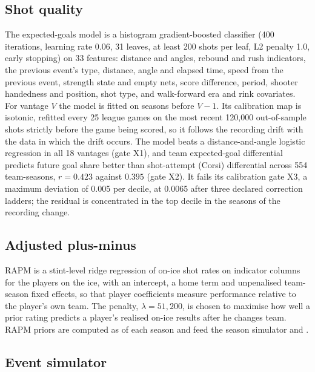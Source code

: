 \subsection{Shot quality}
\label{sec:m-xg}

The expected-goals model is a histogram gradient-boosted classifier
\citep{friedman2001greedy,ke2017lightgbm} (400
iterations, learning rate 0.06, 31 leaves, at least 200 shots per leaf, L2
penalty 1.0, early stopping) on 33 features: distance and angles, rebound and
rush indicators, the previous event's type, distance, angle and elapsed time,
speed from the previous event, strength state and empty nets, score
difference, period, shooter handedness and position, shot type, and
walk-forward era and rink covariates. For vantage $V$ the model is fitted on
seasons before $V-1$. Its calibration map is isotonic, refitted every 25 league
games on the most recent 120,000 out-of-sample shots strictly before the game
being scored, so it follows the recording drift with the data in which the
drift occurs. The model beats a distance-and-angle logistic regression in all
18 vantages (gate X1), and team expected-goal differential predicts future goal
share better than shot-attempt (Corsi) differential across 554 team-seasons,
$r = 0.423$ against $0.395$ (gate X2). It fails its calibration gate X3, a
maximum deviation of 0.005 per decile, at 0.0065 after three declared
correction ladders; the residual is concentrated in the top decile in the
seasons of the recording change.

\subsection{Adjusted plus-minus}
\label{sec:m-rapm}

RAPM is a stint-level ridge regression \citep{hoerl1970ridge} of on-ice shot rates on indicator
columns for the players on the ice, with an intercept, a home term and
unpenalised team-season fixed effects, so that player coefficients measure
performance relative to the player's own team. The penalty, $\lambda = 51{,}200$,
is chosen to maximise how well a prior rating predicts a player's realised
on-ice results after he changes team. RAPM priors are computed as of each
season and feed the season simulator and \neurhlG{}.

\subsection{Event simulator}
\label{sec:m-events}

